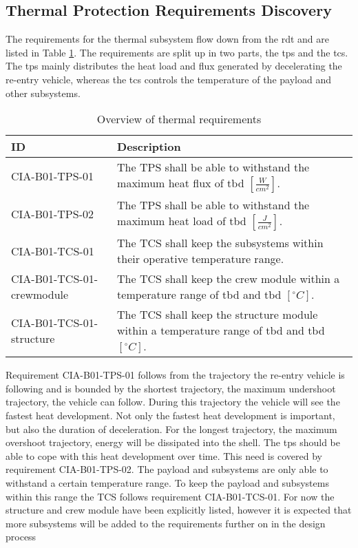\subsection{Thermal Protection Requirements Discovery} \label{sec:therm}
The requirements for the thermal subsystem flow down from the \gls{rdt} and are listed in Table \ref{tab:thermalreq}. The requirements are split up in two parts, the \gls{tps} and the \gls{tcs}. The \gls{tps} mainly distributes the heat load and flux generated by decelerating the re-entry vehicle, whereas the \gls{tcs} controls the temperature of the payload and other subsystems.


\begin{table}[H]
	\caption{Overview of thermal requirements}
	\begin{tabular}{|p{}|p{}|}
    \hline
    ID          & Description                                                                                                      \\ \hline \hline
    CIA-B01-TPS-01 & The TPS shall be able to withstand the maximum heat flux of \gls{tbd} $ \left[\frac{W}{cm^2}\right] $.               
\\ \hline
    CIA-B01-TPS-02 &  The TPS shall be able to withstand the maximum heat load of \gls{tbd} $ \left[\frac{J}{cm^2}\right] $.                
\\ \hline
    CIA-B01-TCS-01 & The TCS shall keep the subsystems within their operative temperature range.                                            
\\ \hline
    CIA-B01-TCS-01-crewmodule & The TCS shall keep the crew module within a temperature range of \gls{tbd} and \gls{tbd} $ \left[^{\circ}C\right] $.                                        
\\ \hline
    CIA-B01-TCS-01-structure & The TCS shall keep the structure module within a temperature range of \gls{tbd} and \gls{tbd} $ \left[^{\circ}C\right] $.                                        
\\ \hline

    \end{tabular}
    \label{tab:thermalreq}
\end{table}

Requirement CIA-B01-TPS-01 follows from the trajectory the re-entry vehicle is following and is bounded by the shortest trajectory, the maximum undershoot trajectory, the vehicle can follow. During this trajectory the vehicle will see the fastest heat development. Not only the fastest heat development is important, but also the duration of deceleration. For the longest trajectory, the maximum overshoot trajectory, energy will be dissipated into the shell. The \gls{tps} should be able to cope with this heat development over time. This need is covered by requirement CIA-B01-TPS-02. The payload and subsystems are only able to withstand a certain temperature range. To keep the payload and subsystems within this range the TCS follows requirement CIA-B01-TCS-01. For now the structure and crew module have been explicitly listed, however it is expected that more subsystems will be added to the requirements further on in the design process

